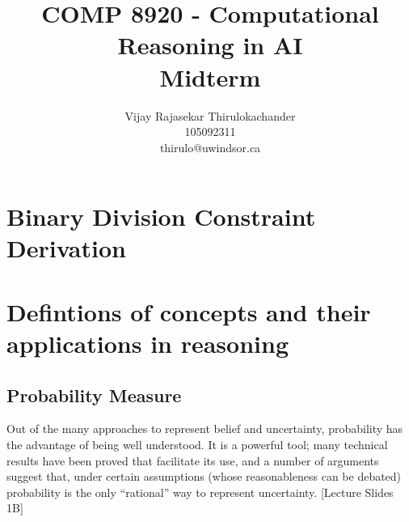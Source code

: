\documentclass[UTF8]{article}
\begin{document}
    
\title{COMP 8920 - Computational Reasoning in AI \\Midterm}
\author{
    Vijay Rajasekar Thirulokachander \\
    \large 105092311 \\
    \large thirulo@uwindsor.ca
}
\maketitle
\date{}


\section{Binary Division Constraint Derivation}
\section{Defintions of concepts and their applications in reasoning}
\subsection{Probability Measure}

Out of the many approaches to represent belief and uncertainty, probability has the advantage of being well understood.  It is a powerful tool; many technical results have been proved that facilitate its use, and a number of arguments suggest that, under certain assumptions (whose reasonableness can be debated) probability is the only “rational” way to represent uncertainty. [Lecture Slides 1B]\\
\end{document}
